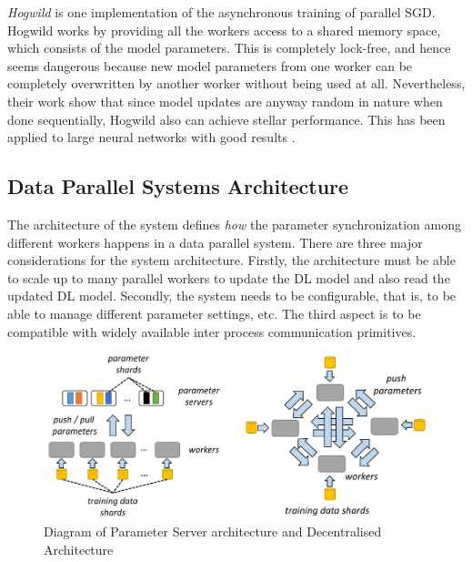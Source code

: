 \emph{Hogwild} \cite{NiuHOGWILD:Descent} is one implementation of the asynchronous training of parallel SGD. Hogwild works by providing all the workers access to a shared memory space, which consists of the model parameters. This is completely lock-free, and hence seems dangerous because new model parameters from one worker can be completely overwritten by another worker without being used at all. Nevertheless, their work show that since model updates are anyway random in nature when done sequentially, Hogwild also can achieve stellar performance. This has been applied to large neural networks with good results \cite{Deyringer2017ParallelizationHogwild}. 


\subsection{Data Parallel Systems Architecture}
The architecture of the system defines \emph{how} the parameter synchronization among different workers happens in a data parallel system. There are three major considerations for the system architecture. Firstly, the architecture must be able to scale up to many parallel workers to update the DL model and also read the updated DL model. Secondly, the system needs to be configurable, that is, to be able to manage different parameter settings, etc. The third aspect is to be compatible with widely available inter process communication primitives.

\begin{figure}[ht]
  \begin{center}
    \includegraphics[width=\textwidth]{images/architecture_.png} 
    \caption{Diagram of Parameter Server architecture and Decentralised Architecture  \cite{Mayer2020ScalableInfrastructures}}
    \label{fig:arch}
  \end{center}
\end{figure}


